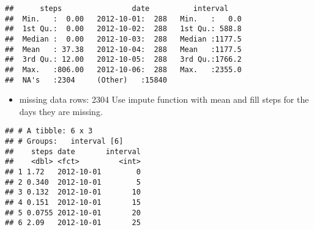 \documentclass[]{article}
\newenvironment{Shaded}{\begin{snugshade}}{\end{snugshade}}
\newcommand{\ControlFlowTok}[1]{\textcolor[rgb]{0.13,0.29,0.53}{\textbf{#1}}}
\newcommand{\DataTypeTok}[1]{\textcolor[rgb]{0.13,0.29,0.53}{#1}}
\newcommand{\KeywordTok}[1]{\textcolor[rgb]{0.13,0.29,0.53}{\textbf{#1}}}
\newcommand{\NormalTok}[1]{#1}
\newcommand{\OperatorTok}[1]{\textcolor[rgb]{0.81,0.36,0.00}{\textbf{#1}}}
\newcommand{\OtherTok}[1]{\textcolor[rgb]{0.56,0.35,0.01}{#1}}
\newcommand{\StringTok}[1]{\textcolor[rgb]{0.31,0.60,0.02}{#1}}
\providecommand{\tightlist}{%
  \setlength{\itemsep}{0pt}\setlength{\parskip}{0pt}}
\begin{document}
\begin{Shaded}
\end{Shaded}

\begin{verbatim}
##      steps                date          interval     
##  Min.   :  0.00   2012-10-01:  288   Min.   :   0.0  
##  1st Qu.:  0.00   2012-10-02:  288   1st Qu.: 588.8  
##  Median :  0.00   2012-10-03:  288   Median :1177.5  
##  Mean   : 37.38   2012-10-04:  288   Mean   :1177.5  
##  3rd Qu.: 12.00   2012-10-05:  288   3rd Qu.:1766.2  
##  Max.   :806.00   2012-10-06:  288   Max.   :2355.0  
##  NA's   :2304     (Other)   :15840
\end{verbatim}

\begin{itemize}
\tightlist
\item
  missing data rows: 2304 Use impute function with mean and fill steps
  for the days they are missing.
\end{itemize}

\begin{Shaded}
\end{Shaded}

\begin{verbatim}
## # A tibble: 6 x 3
## # Groups:   interval [6]
##    steps date       interval
##    <dbl> <fct>         <int>
## 1 1.72   2012-10-01        0
## 2 0.340  2012-10-01        5
## 3 0.132  2012-10-01       10
## 4 0.151  2012-10-01       15
## 5 0.0755 2012-10-01       20
## 6 2.09   2012-10-01       25
\end{verbatim}
\end{document}
